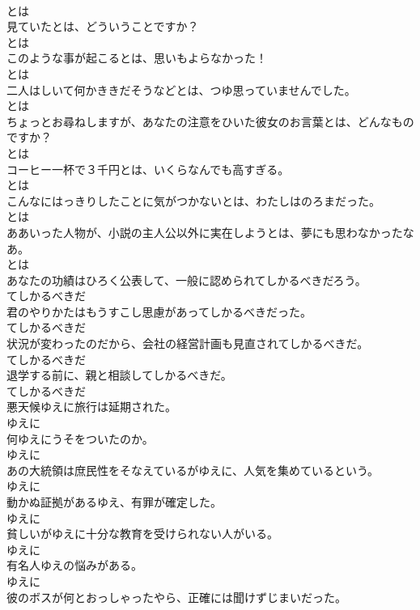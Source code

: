 \documentclass[8pt]{extreport}
\begin{document}
\begin{CJK}{UTF8}{min}
\\	とは
\\	見ていたとは、どういうことですか？	
\\	とは
\\	このような事が起こるとは、思いもよらなかった！	
\\	とは
\\	二人はしいて何かききだそうなどとは、つゆ思っていませんでした。	
\\	とは
\\	ちょっとお尋ねしますが、あなたの注意をひいた彼女のお言葉とは、どんなものですか？	
\\	とは
\\	コーヒー一杯で３千円とは、いくらなんでも高すぎる。	
\\	とは
\\	こんなにはっきりしたことに気がつかないとは、わたしはのろまだった。	
\\	とは
\\	ああいった人物が、小説の主人公以外に実在しようとは、夢にも思わなかったなあ。	
\\	とは
\\	あなたの功績はひろく公表して、一般に認められてしかるべきだろう。	
\\	てしかるべきだ
\\	君のやりかたはもうすこし思慮があってしかるべきだった。	
\\	てしかるべきだ
\\	状況が変わったのだから、会社の経営計画も見直されてしかるべきだ。	
\\	てしかるべきだ
\\	退学する前に、親と相談してしかるべきだ。	
\\	てしかるべきだ
\\	悪天候ゆえに旅行は延期された。	
\\	ゆえに
\\	何ゆえにうそをついたのか。	
\\	ゆえに
\\	あの大統領は庶民性をそなえているがゆえに、人気を集めているという。	
\\	ゆえに
\\	動かぬ証拠があるゆえ、有罪が確定した。	
\\	ゆえに
\\	貧しいがゆえに十分な教育を受けられない人がいる。	
\\	ゆえに
\\	有名人ゆえの悩みがある。	
\\	ゆえに
\\	彼のボスが何とおっしゃったやら、正確には聞けずじまいだった。	

\end{CJK}
\end{document}
